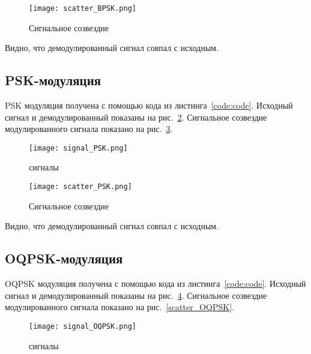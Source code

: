 \begin{figure}[H]
	\begin{center}
		\texttt{[image: scatter\_BPSK.png]}
		\caption{Сигнальное созвездие} %
		\label{scatter_BPSK} %
	\end{center}
\end{figure}

Видно, что демодулированный сигнал совпал с исходным.

\subsection{PSK-модуляция}
 
PSK модуляция получена с помощью кода из листинга~\ref{code:code}. 
Исходный сигнал и демодулированный показаны на рис.~\ref{signal_PSK}. Сигнальное созвездие
модулированного сигнала показано на рис.~\ref{scatter_PSK}.
\begin{figure}[H]
	\begin{center}
		\texttt{[image: signal\_PSK.png]}
		\caption{сигналы} %
		\label{signal_PSK} %
	\end{center}
\end{figure}

\begin{figure}[H]
	\begin{center}
		\texttt{[image: scatter\_PSK.png]}
		\caption{Сигнальное созвездие} %
		\label{scatter_PSK} %
	\end{center}
\end{figure}

Видно, что демодулированный сигнал совпал с исходным.


\subsection{OQPSK-модуляция}

OQPSK модуляция получена с помощью кода из листинга~\ref{code:code}. 
Исходный сигнал и демодулированный показаны на рис.~\ref{signal_OQPSK}. Сигнальное созвездие
модулированного сигнала показано на рис.~\ref{scatter_OQPSK}.
\begin{figure}[H]
	\begin{center}
		\texttt{[image: signal\_OQPSK.png]}
		\caption{сигналы} %
		\label{signal_OQPSK} %
	\end{center}
\end{figure}

